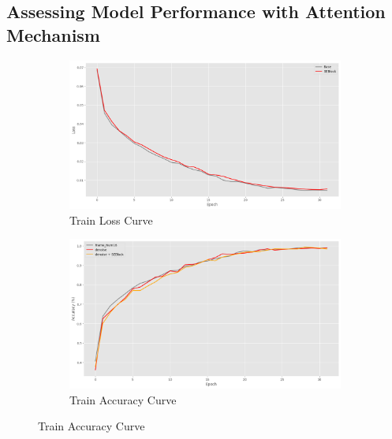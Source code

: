 \documentclass[conference]{IEEEtran}
\begin{document}
\subsection{Assessing Model Performance with Attention Mechanism}
\begin{figure}[htbp]
    \centering
    \begin{subfigure}[b]{0.24\textwidth}
        \centering
        \includegraphics[width=\textwidth]{figure/SE_train_loss.png}
        \caption{Train Loss Curve}
        \label{fig:sub1}
    \end{subfigure}
    \begin{subfigure}[b]{0.24\textwidth}
        \centering
        \includegraphics[width=\textwidth]{figure/SE_train_accpng.png}
        \caption{Train Accuracy Curve}
        \label{fig:sub2}
    \end{subfigure}

    \vspace{0.01em} %


\end{figure}
\end{document}

